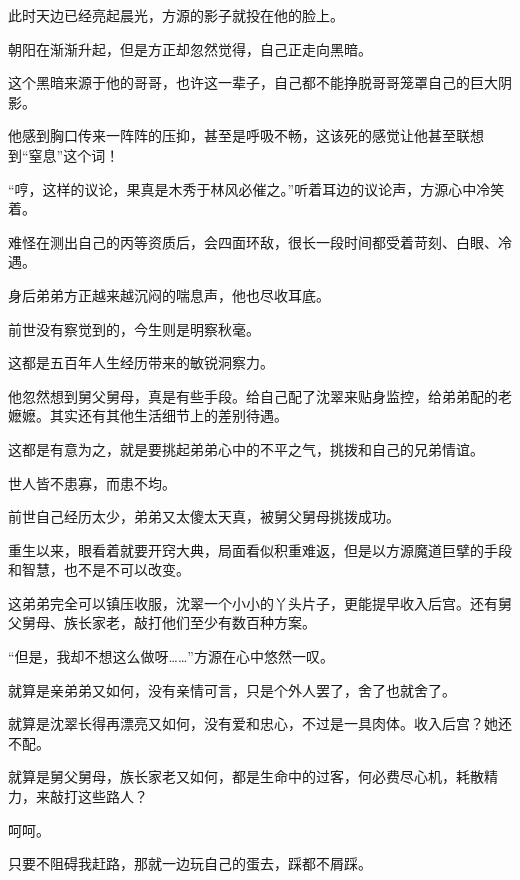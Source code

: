 \begin{this_body}
此时天边已经亮起晨光，方源的影子就投在他的脸上。

朝阳在渐渐升起，但是方正却忽然觉得，自己正走向黑暗。

这个黑暗来源于他的哥哥，也许这一辈子，自己都不能挣脱哥哥笼罩自己的巨大阴影。

他感到胸口传来一阵阵的压抑，甚至是呼吸不畅，这该死的感觉让他甚至联想到“窒息”这个词！

“哼，这样的议论，果真是木秀于林风必催之。”听着耳边的议论声，方源心中冷笑着。

难怪在测出自己的丙等资质后，会四面环敌，很长一段时间都受着苛刻、白眼、冷遇。

身后弟弟方正越来越沉闷的喘息声，他也尽收耳底。

前世没有察觉到的，今生则是明察秋毫。

这都是五百年人生经历带来的敏锐洞察力。

他忽然想到舅父舅母，真是有些手段。给自己配了沈翠来贴身监控，给弟弟配的老嬷嬷。其实还有其他生活细节上的差别待遇。

这都是有意为之，就是要挑起弟弟心中的不平之气，挑拨和自己的兄弟情谊。

世人皆不患寡，而患不均。

前世自己经历太少，弟弟又太傻太天真，被舅父舅母挑拨成功。

重生以来，眼看着就要开窍大典，局面看似积重难返，但是以方源魔道巨擘的手段和智慧，也不是不可以改变。

这弟弟完全可以镇压收服，沈翠一个小小的丫头片子，更能提早收入后宫。还有舅父舅母、族长家老，敲打他们至少有数百种方案。

“但是，我却不想这么做呀……”方源在心中悠然一叹。

就算是亲弟弟又如何，没有亲情可言，只是个外人罢了，舍了也就舍了。

就算是沈翠长得再漂亮又如何，没有爱和忠心，不过是一具肉体。收入后宫？她还不配。

就算是舅父舅母，族长家老又如何，都是生命中的过客，何必费尽心机，耗散精力，来敲打这些路人？

呵呵。

只要不阻碍我赶路，那就一边玩自己的蛋去，踩都不屑踩。

\end{this_body}

